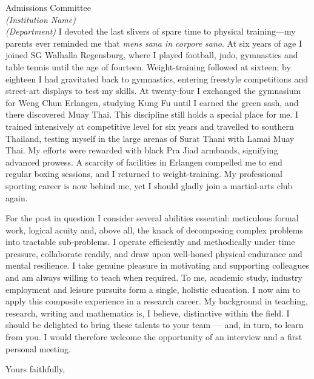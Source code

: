 \documentclass[11pt]{letter}
\begin{document}
\begin{letter}{%
Admissions Committee\\[2pt]%
\textit{(Institution Name)}\\%
\textit{(Department)}}
I devoted the last slivers of spare time to physical training—my parents ever reminded me that \textit{mens sana in corpore sano}. At six years of age I joined SG Walhalla Regensburg, where I played football, judo, gymnastics and table tennis until the age of fourteen. Weight-training followed at sixteen; by eighteen I had gravitated back to gymnastics, entering freestyle competitions and street-art displays to test my skills. At twenty-four I exchanged the gymnasium for Weng Chun Erlangen, studying Kung Fu until I earned the green sash, and there discovered Muay Thai. This discipline still holds a special place for me. I trained intensively at competitive level for six years and travelled to southern Thailand, testing myself in the large arenas of Surat Thani with Lamai Muay Thai. My efforts were rewarded with black Pra Jiad armbands, signifying advanced prowess. A scarcity of facilities in Erlangen compelled me to end regular boxing sessions, and I returned to weight-training. My professional sporting career is now behind me, yet I should gladly join a martial-arts club again.

For the post in question I consider several abilities essential: meticulous formal work, logical acuity and, above all, the knack of decomposing complex problems into tractable sub-problems. I operate efficiently and methodically under time pressure, collaborate readily, and draw upon well-honed physical endurance and mental resilience. I take genuine pleasure in motivating and supporting colleagues and am always willing to teach when required. To me, academic study, industry employment and leisure pursuits form a single, holistic education. I now aim to apply this composite experience in a research career. My background in teaching, research, writing and mathematics is, I believe, distinctive within the field. I should be delighted to bring these talents to your team — and, in turn, to learn from you. I would therefore welcome the opportunity of an interview and a first personal meeting.

\closing{Yours faithfully,}

\end{letter}
\end{document}
